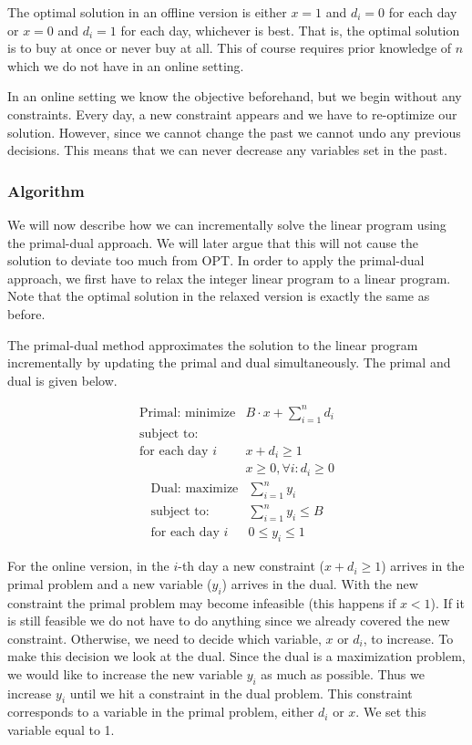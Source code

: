 The optimal solution in an offline version is either $x=1$ and $d_i = 0$ for each day or $x=0$ and $d_i = 1$ for each day, whichever is best.
That is, the optimal solution is to buy at once or never buy at all.
This of course requires prior knowledge of $n$ which we do not have in an online setting.

In an online setting we know the objective beforehand, but we begin without any constraints.
Every day, a new constraint appears and we have to re-optimize our solution.
However, since we cannot change the past we cannot undo any previous decisions.
This means that we can never decrease any variables set in the past.

\subsubsection{Algorithm}

We will now describe how we can incrementally solve the linear program using the primal-dual approach.
We will later argue that this will not cause the solution to deviate too much from OPT.
In order to apply the primal-dual approach, we first have to relax the integer linear program to a linear program. Note that the optimal solution in the relaxed version is exactly the same as before.

The primal-dual method approximates the solution to the linear program incrementally by updating the primal and dual simultaneously.
The primal and dual is given below.

\[
	\begin{array}{lr}
	\textrm{Primal: minimize}   & B\cdot x + \sum^n_{i=1} d_i   \\
	\textrm{subject to:} & \\
	\textrm{for each day $i$} & x + d_i  \ge 1  \\
			    & x     \geq 0, \forall i : d_i \ge 0
	\end{array}
\]
\[
	\begin{array}{lr}
	\textrm{Dual: maximize}   & \sum^n_{i=1} y_i   \\
	\textrm{subject to:} & \sum^n_{i=1} y_i \le B \\
	\textrm{for each day $i$} & 0 \le y_i  \le 1
	\end{array}
\]

For the online version, in the $i$-th day a new constraint ($x + d_i  \ge 1$) arrives in the primal problem and a new variable ($y_i$) arrives in the dual. 
With the new constraint the primal problem may become infeasible (this happens if $x < 1$). 
If it is still feasible we do not have to do anything since we already covered the new constraint. 
Otherwise, we need to decide which variable, $x$ or $d_i$, to increase. 
To make this decision we look at the dual. 
Since the dual is a maximization problem, we would like to increase the new variable $y_i$ as much as possible.
Thus we increase $y_i$ until we hit a constraint in the dual problem.
This constraint corresponds to a variable in the primal problem, either $d_i$ or $x$.
We set this variable equal to 1.

